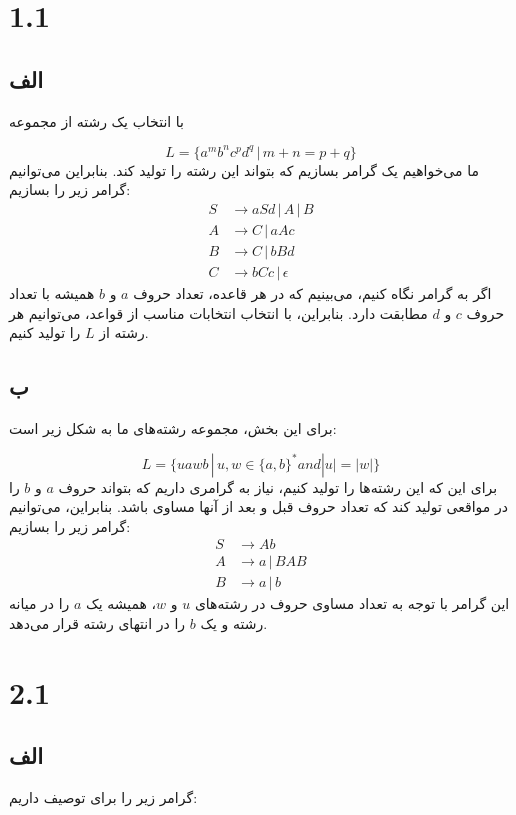 \section*{1.1}

\subsection*{الف}
با انتخاب یک رشته از مجموعه

\[L = \{a^m b^n c^p d^q \, | \, m + n = p + q\}\]
ما می‌خواهیم یک گرامر بسازیم که بتواند این رشته را تولید کند. بنابراین می‌توانیم گرامر زیر را بسازیم:
\begin{align*}
	S &\to a S d \, | \, A \, | \, B \\
	A &\to C \, | \, a A c \\
	B &\to C \, | \, b B d \\
	C &\to b C c \, | \, \epsilon
\end{align*}
اگر به گرامر نگاه کنیم، می‌بینیم که در هر قاعده، تعداد حروف $a$ و $b$ همیشه با تعداد حروف $c$ و $d$ مطابقت دارد. بنابراین، با انتخاب انتخابات مناسب از قواعد، می‌توانیم هر رشته از $L$ را تولید کنیم.

\subsection*{ب}
برای این بخش، مجموعه رشته‌های ما به شکل زیر است:

\[
L = \{u a w b \, | \, u, w \in \{a,b\}^{*} and |u| = |w|\}
\]
برای این که این رشته‌ها را تولید کنیم، نیاز به گرامری داریم که بتواند حروف $a$ و $b$ را در مواقعی تولید کند که تعداد حروف قبل و بعد از آنها مساوی باشد. بنابراین، می‌توانیم گرامر زیر را بسازیم:
\begin{align*}
	S &\to Ab \\
	A &\to a \, | \, B A B\\
	B &\to a \, | \, b
\end{align*}
این گرامر با توجه به تعداد مساوی حروف در رشته‌های $u$ و $w$، همیشه یک $a$ را در میانه رشته و یک $b$ را در انتهای رشته قرار می‌دهد.

\section*{2.1}

\subsection*{الف}
گرامر زیر را برای توصیف داریم:


